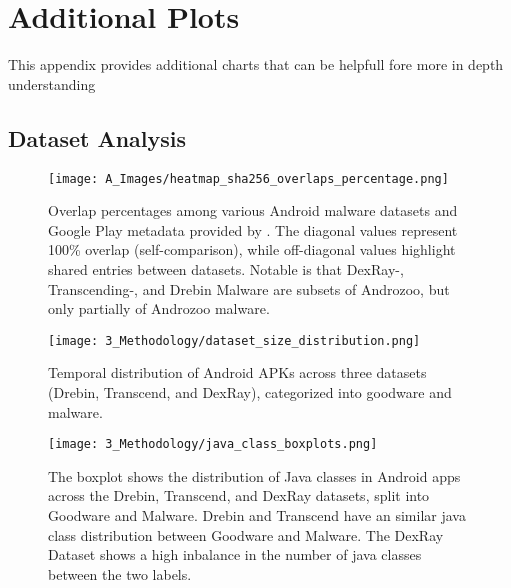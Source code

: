  
\chapter{Additional Plots}
\label{appendiximages}
\label{appendix-more-details-on-template}

This appendix provides additional charts that can be helpfull fore more in depth understanding

\section{Dataset Analysis}\label{AppendixDatasetAnalysis}

\begin{figure*}[htb]
    \centering
    \begin{minipage}{1.5\textwidth}
        \centering
        \texttt{[image: A\_Images/heatmap\_sha256\_overlaps\_percentage.png]}
        \captionsetup{width=\textwidth}
        \caption{\label{fig:dataset_overlap}
        Overlap percentages among various Android malware datasets and Google Play metadata provided by \cite{gp_metadata}. 
        The diagonal values represent 100\% overlap (self-comparison), 
        while off-diagonal values highlight shared entries between datasets.
        Notable is that DexRay-, Transcending-, and Drebin Malware are subsets of Androzoo,
        but only partially of Androzoo malware.
        }
    \end{minipage}
\end{figure*}

\newpage

\begin{figure*}[h]
    \centering
    \texttt{[image: 3\_Methodology/dataset\_size\_distribution.png]}
    \caption{\label{fig:dataset_size_evaluation}
    Temporal distribution of Android APKs across three datasets (Drebin, Transcend, and DexRay), 
    categorized into goodware and malware.}
\end{figure*}



\begin{figure*}[b!]
    \centering
    \begin{minipage}{1.5\textwidth}
        \centering
        \texttt{[image: 3\_Methodology/java\_class\_boxplots.png]}
        \captionsetup{width=\textwidth}
        \caption{\label{fig:java_class_boxplots}
        The boxplot shows the distribution of Java classes in Android apps 
        across the Drebin, Transcend, and DexRay datasets, 
        split into Goodware and Malware. 
        Drebin and Transcend have an similar java class distribution 
        between Goodware and Malware.
        The DexRay Dataset shows a high inbalance in the number of java classes 
        between the two labels.
        }
    \end{minipage}
\end{figure*}



